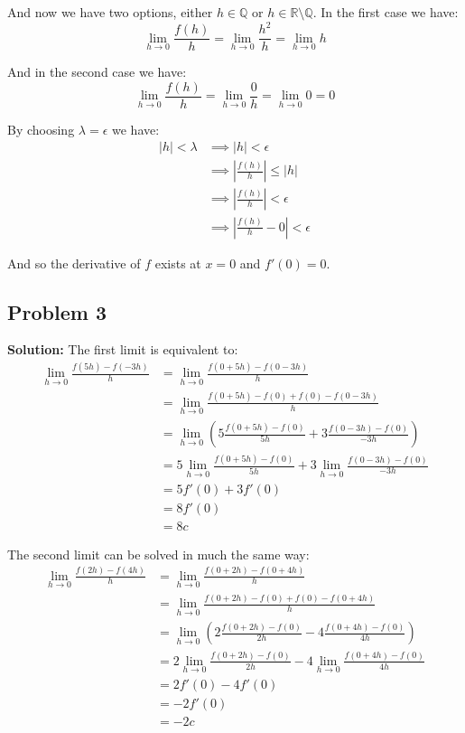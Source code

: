 \documentclass{article}
\newcommand{\R}{\mathbb R}
\newcommand{\Q}{\mathbb Q}
\begin{document}
And now we have two options, either $h\in\Q$ or $h\in\R\setminus\Q$. In the first case we have:
$$\lim_{h\to0}\frac{f(h)}{h}=\lim_{h\to0}\frac{h^2}{h}=\lim_{h\to0}h$$

And in the second case we have:
$$\lim_{h\to0}\frac{f(h)}{h}=\lim_{h\to0}\frac{0}{h}=\lim_{h\to0}0=0$$

By choosing $\lambda=\epsilon$ we have:
\begin{align*}
  |h|<\lambda&\implies|h|<\epsilon\tag{$\lambda=\epsilon$}\\
  &\implies\left|\frac{f(h)}{h}\right|\le|h|\tag{limit is either $h$ or 0}\\
  &\implies\left|\frac{f(h)}{h}\right|<\epsilon\\
  &\implies\left|\frac{f(h)}{h}-0\right|<\epsilon
\end{align*}

And so the derivative of $f$ exists at $x=0$ and $f'(0)=0$.

\subsection*{Problem 3}
\noindent\textbf{Solution:} The first limit is equivalent to:
\begin{align*}
  \lim_{h\to0}\frac{f(5h)-f(-3h)}{h}&=\lim_{h\to0}\frac{f(0+5h)-f(0-3h)}{h}\\
  &=\lim_{h\to0}\frac{f(0+5h)-f(0)+f(0)-f(0-3h)}{h}\\
  &=\lim_{h\to0}\left(5\frac{f(0+5h)-f(0)}{5h}+3\frac{f(0-3h)-f(0)}{-3h}\right)\\
  &=5\lim_{h\to0}\frac{f(0+5h)-f(0)}{5h}+3\lim_{h\to0}\frac{f(0-3h)-f(0)}{-3h}\tag{limit of sum is sum of limits}\\
  &=5f'(0)+3f'(0)\tag{def. of derivative, change of variables}\\
  &=8f'(0)\\
  &=8c\tag{$f'(0)=c$}
\end{align*}

The second limit can be solved in much the same way:
\begin{align*}
  \lim_{h\to0}\frac{f(2h)-f(4h)}{h}&=\lim_{h\to0}\frac{f(0+2h)-f(0+4h)}{h}\\
  &=\lim_{h\to0}\frac{f(0+2h)-f(0)+f(0)-f(0+4h)}{h}\\
  &=\lim_{h\to0}\left(2\frac{f(0+2h)-f(0)}{2h}-4\frac{f(0+4h)-f(0)}{4h}\right)\\
  &=2\lim_{h\to0}\frac{f(0+2h)-f(0)}{2h}-4\lim_{h\to0}\frac{f(0+4h)-f(0)}{4h}\tag{limit of sum is sum of limits}\\
  &=2f'(0)-4f'(0)\tag{def. of derivative, change of variables}\\
  &=-2f'(0)\\
  &=-2c\tag{$f'(0)=c$}
\end{align*}
\end{document}
